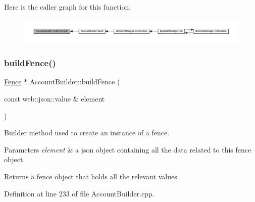 Here is the caller graph for this function\+:\nopagebreak
\begin{figure}[H]
\begin{center}
\leavevmode
\includegraphics[width=350pt]{d9/daa/class_account_builder_aa3af3cf2501508d76ee3f7140deeba80_icgraph}
\end{center}
\end{figure}
\mbox{\label{class_account_builder_ac5801a1130d7a1f84a66c45cfd6e0a8d}} 
\subsubsection{\texorpdfstring{build\+Fence()}{buildFence()}}
{\footnotesize\ttfamily \hyperlink{class_fence}{Fence} $\ast$ Account\+Builder\+::build\+Fence (\begin{DoxyParamCaption}\item[{const web\+::json\+::value \&}]{element }\end{DoxyParamCaption})\hspace{0.3cm}{\ttfamily [private]}}

Builder method used to create an instance of a fence.


\begin{DoxyParams}{Parameters}
{\em element} & a json object containing all the data related to this fence object \\
\hline
\end{DoxyParams}
\begin{DoxyReturn}{Returns}
a fence object that holds all the relevant values 
\end{DoxyReturn}


Definition at line 233 of file Account\+Builder.\+cpp.


